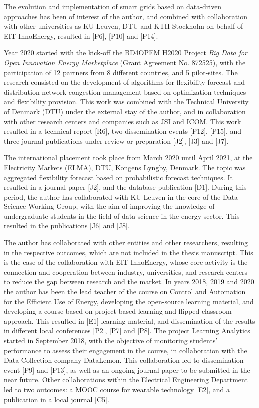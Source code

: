 The evolution and implementation of smart grids based on data-driven approaches has been of interest of the author, and combined with collaboration with other universities as KU Leuven, DTU and KTH Stockholm on behalf of EIT InnoEnergy, resulted in [P6], [P10] and [P14]. 

Year 2020 started with the kick-off the BD4OPEM H2020 Project \textit{Big Data for Open Innovation Energy Marketplace} (Grant Agreement No. 872525), with the participation of 12 partners from 8 different countries, and 5 pilot-sites. The research consisted on the development of algorithms for flexibility forecast and distribution network congestion management based on optimization techniques and flexibility provision. This work was combined with the Technical University of Denmark (DTU) under the external stay of the author, and in collaboration with other research centers and companies such as JSI and ICOM. This work resulted in a technical report [R6], two dissemination events [P12], [P15], and three journal publications under review or preparation [J2], [J3] and [J7].  

The international placement took place from March 2020 until April 2021, at the Electricity Markets (ELMA), DTU, Kongens Lyngby, Denmark. The topic was aggregated flexibility forecast based on probabilistic forecast techniques. It resulted in a journal paper [J2], and the database publication [D1]. During this period, the author has collaborated with KU Leuven in the core of the Data Science Working Group, with the aim of improving the knowledge of undergraduate students in the field of data science in the energy sector. This resulted in the publications [J6] and [J8]. 

The author has collaborated with other entities and other researchers, resulting in the respective outcomes, which are not included in the thesis manuscript. This is the case of the collaboration with EIT InnoEnergy, whose core activity is the connection and cooperation between industry, universities, and research centers to reduce the gap between research and the market. In years 2018, 2019 and 2020 the author has been the lead teacher of the course on Control and Automation for the Efficient Use of Energy, developing the open-source learning material, and developing a course based on project-based learning and flipped classroom approach. This resulted in [E1] learning material, and dissemination of the results in different local conferences [P2], [P7] and [P8]. The project Learning Analytics started in September 2018, with the objective of monitoring students' performance to assess their engagement in the course, in collaboration with the Data Collection company DataLemon. This collaboration led to dissemination event [P9] and [P13], as well as an ongoing journal paper to be submitted in the near future. Other collaborations within the Electrical Engineering Department led to two outcomes: a MOOC course for wearable technology [E2], and a publication in a local journal [C5]. 


